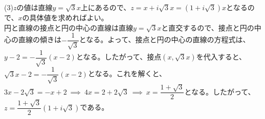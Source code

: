 \documentclass[dvipdfmx,twoside]{jsarticle}
\begin{document}
\begin{CJK}{UTF8}{ipxm}
\noindent
(3)\quad $z$の値は直線$y=\sqrt{3}x$上にあるので、$z=x+i\sqrt{3}x=(1+i\sqrt{3})x$となるので、$x$の具体値を求めればよい。\\[0.5em]
円と直線の接点と円の中心の直線は直線$y=\sqrt{3}x$と直交するので、接点と円の中心の直線の傾きは$-\dfrac{1}{\sqrt{3}}$となる。よって、接点と円の中心の直線の方程式は、$y-2=-\dfrac{1}{\sqrt{3}}(x-2)$となる。したがって、接点$(x,\sqrt{3}x)$を代入すると、$\sqrt{3}x-2=-\dfrac{1}{\sqrt{3}}(x-2)$となる。これを解くと、
$3x-2\sqrt{3}=-x+2\ \implies\ 4x=2+2\sqrt{3}\ \implies\ x=\dfrac{1+\sqrt{3}}{2}$となる。したがって、$z=\dfrac{1+\sqrt{3}}{2}(1+i\sqrt{3})$である。\\
\end{CJK}
\end{document}

